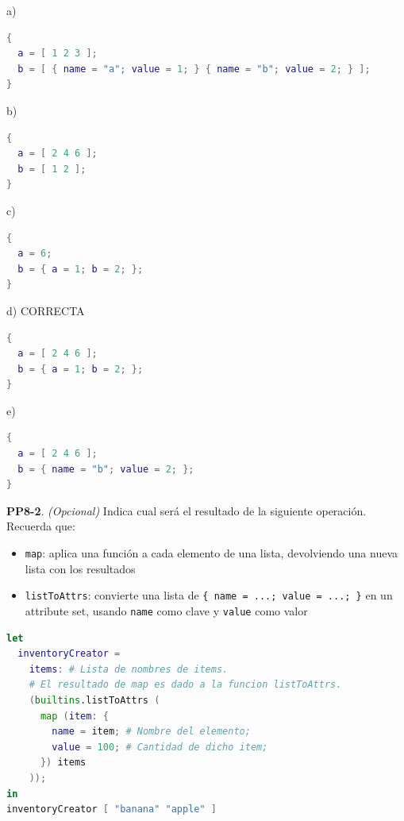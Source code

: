 \begin{opcion}{a)}
\begin{lstlisting}[language=nix]
{
  a = [ 1 2 3 ];
  b = [ { name = "a"; value = 1; } { name = "b"; value = 2; } ];
}
\end{lstlisting}
\end{opcion}

\begin{opcion}{b)}
\begin{lstlisting}[language=nix]
{
  a = [ 2 4 6 ];
  b = [ 1 2 ];
}
\end{lstlisting}
\end{opcion}

\begin{opcion}{c)}
\begin{lstlisting}[language=nix]
{
  a = 6;
  b = { a = 1; b = 2; };
}
\end{lstlisting}
\end{opcion}

\begin{opcion}{d)}
CORRECTA
\begin{lstlisting}[language=nix]
{
  a = [ 2 4 6 ];
  b = { a = 1; b = 2; };
}
\end{lstlisting}
\end{opcion}

\begin{opcion}{e)}
\begin{lstlisting}[language=nix]
{
  a = [ 2 4 6 ];
  b = { name = "b"; value = 2; };
}
\end{lstlisting}
\end{opcion}

\textbf{PP8-2}. \emph{(Opcional)} Indica cual será el resultado de la siguiente operación. Recuerda que:

\begin{itemize}
\item \texttt{map}: aplica una función a cada elemento de una lista, devolviendo una nueva lista con los resultados
\item \texttt{listToAttrs}: convierte una lista de \texttt{\{ name = .\allowbreak{}.\allowbreak{}.\allowbreak{}; value = .\allowbreak{}.\allowbreak{}.\allowbreak{}; \}} en un attribute set, usando \texttt{name} como clave y \texttt{value} como valor
\end{itemize}

\begin{bloquecodigo}
\begin{lstlisting}[language=nix]
let
  inventoryCreator =
    items: # Lista de nombres de items.
    # El resultado de map es dado a la funcion listToAttrs.
    (builtins.listToAttrs (
      map (item: {
        name = item; # Nombre del elemento;
        value = 100; # Cantidad de dicho item;
      }) items
    ));
in
inventoryCreator [ "banana" "apple" ]
\end{lstlisting}
\end{bloquecodigo}


